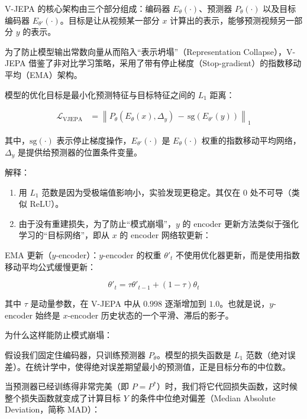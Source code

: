 V-JEPA 的核心架构由三个部分组成：编码器 \(E_\theta(\cdot)\)、预测器 \(P_\theta(\cdot)\) 以及目标编码器 \(E_{\theta'}(\cdot)\)。目标是让从视频某一部分 \(x\) 计算出的表示，能够预测视频另一部分 \(y\) 的表示。

为了防止模型输出常数向量从而陷入``表示坍塌''（Representation Collapse），V-JEPA 借鉴了非对比学习策略，采用了带有停止梯度（Stop-gradient）的指数移动平均（EMA）架构。

模型的优化目标是最小化预测特征与目标特征之间的 \(L_1\) 距离：

\[
\begin{aligned}
\mathcal{L}_{\mathrm{VJEPA}}
&=
\left\|
P_\theta(E_\theta(x),\Delta_y)
\, - \, \mathrm{sg}(E_{\theta'}(y))
\right\|_1
\end{aligned}
\]

其中，\(\mathrm{sg}(\cdot)\) 表示停止梯度操作，\(E_{\theta'}(\cdot)\) 是 \(E_\theta(\cdot)\) 权重的指数移动平均网络，\(\Delta_y\) 是提供给预测器的位置条件变量。

解释：

\begin{enumerate}
\def\labelenumi{\arabic{enumi}.}
\item
  用 \(L_1\) 范数是因为受极端值影响小，实验发现更稳定。其仅在 \(0\) 处不可导（类似 ReLU）。
\item
{}
  由于没有重建损失，为了防止``模式崩塌''，\(y\) 的 encoder 更新方法类似于强化学习的``目标网络''，即从 \(x\) 的 encoder 网络软更新：
\end{enumerate}

EMA 更新（\(y\)-encoder）：\(y\)-encoder 的权重 \(\theta'_t\) 不使用优化器更新，而是使用指数移动平均公式缓慢更新：

\[
\theta'_t=\tau\theta'_{t-1}+(1-\tau)\theta_t
\]

其中 \(\tau\) 是动量参数，在 V-JEPA 中从 \(0.998\) 逐渐增加到 \(1.0\)。也就是说，\(y\)-encoder 始终是 \(x\)-encoder 历史状态的一个平滑、滞后的影子。

为什么这样能防止模式崩塌：

假设我们固定住编码器，只训练预测器 \(P_\theta\)。模型的损失函数是 \(L_1\) 范数（绝对误差）。在统计学中，使得绝对误差期望最小的预测值，正是目标分布的中位数。

当预测器已经训练得非常完美（即 \(P=P^{*}\)）时，我们将它代回损失函数，这时候整个损失函数就变成了计算目标 \(Y\) 的条件中位绝对偏差（Median Absolute Deviation，简称 MAD）：

